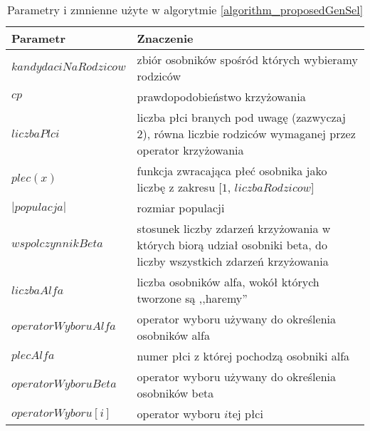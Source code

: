 \documentclass[twoside]{iisthesis}
\begin{document}
\begin{table}
	\caption{Parametry i zmnienne użyte w algorytmie \ref{algorithm_proposedGenSel}}
	\label{table_proposedGenSel}
	\begin{tabularx}{\linewidth}{lX}
		\hline
		\textbf{Parametr} & \textbf{Znaczenie} \\
		\hline
		\hline
		$kandydaciNaRodzicow$ & zbiór osobników spośród których wybieramy rodziców \\
		\hline
		$cp$ & prawdopodobieństwo krzyżowania \\
		\hline
		$liczbaPlci$ & liczba płci branych pod uwagę (zazwyczaj 2), równa liczbie rodziców wymaganej przez operator krzyżowania \\
		\hline
		$plec(x)$ & funkcja zwracająca płeć osobnika jako liczbę z zakresu [$1$, $liczbaRodzicow$] \\
		\hline 
		$|populacja|$ & rozmiar populacji \\
		\hline
		$wspolczynnikBeta$ & stosunek liczby zdarzeń krzyżowania w których biorą udział osobniki beta, do liczby wszystkich zdarzeń krzyżowania  \\
		\hline
		$liczbaAlfa$ & liczba osobników alfa, wokół których tworzone są ,,haremy'' \\
		\hline
		$operatorWyboruAlfa$ & operator wyboru używany do określenia osobników alfa \\
		\hline
		$plecAlfa$ & numer płci z której pochodzą osobniki alfa \\
		\hline
		$operatorWyboruBeta$ & operator wyboru używany do określenia osobników beta \\
		\hline
		$operatorWyboru[i]$ & operator wyboru $i$tej płci \\
		\hline
	\end{tabularx}
\end{table}
\end{document}

